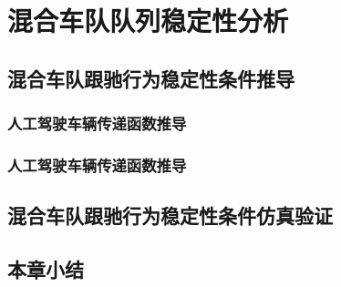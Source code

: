 
\chapter{混合车队队列稳定性分析}
\label{sec:3}

\section{混合车队跟驰行为稳定性条件推导}

\subsection{人工驾驶车辆传递函数推导}

\subsection{人工驾驶车辆传递函数推导}

\section{混合车队跟驰行为稳定性条件仿真验证}

\section{本章小结}